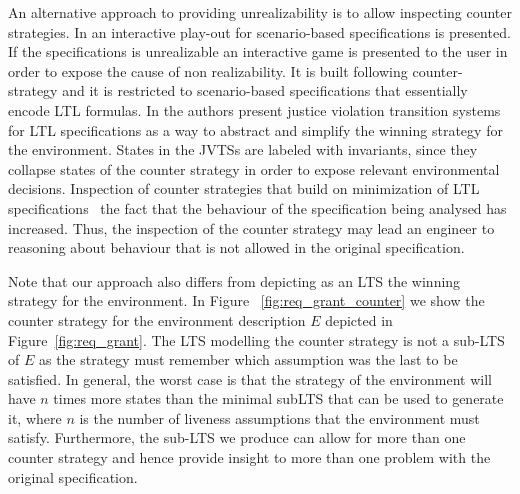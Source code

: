 An alternative approach to providing unrealizability is to allow inspecting counter strategies. 
 In \cite{DBLP:conf/emsoft/CernyGHRT12} an interactive play-out for scenario-based specifications is presented.  If the specifications is unrealizable an interactive game is presented to the user in order to expose the cause of non realizability.  It is built following \cite{DBLP:conf/hvc/KonighoferHB10} counter-strategy and it is restricted to scenario-based specifications that essentially encode LTL formulas.
 In \cite{DBLP:conf/sigsoft/KuventMR17} the authors present
 justice violation transition systems for LTL specifications as a way to abstract
 and simplify the winning strategy for the environment.
 States in the JVTSs are labeled with invariants, since
 they  collapse states of the counter strategy
 in order to expose relevant environmental decisions.
Inspection of counter strategies that build on minimization of LTL specifications~\cite{DBLP:conf/emsoft/CernyGHRT12,DBLP:conf/sigsoft/KuventMR17} the fact that the behaviour of the specification being analysed has increased. Thus, the inspection of the counter strategy may lead an engineer to reasoning about behaviour that is not allowed in the original specification. 

  

 Note that our approach also differs from depicting as an LTS the winning strategy for the environment. In Figure ~\ref{fig:req_grant_counter} we show the counter strategy for the environment description $E$ depicted in Figure~\ref{fig:req_grant}. The LTS modelling the counter strategy is not a sub-LTS of $E$ as the strategy must remember which assumption was the last to be satisfied. In general, the worst case is that the strategy of the environment will have $n$ times more states than the minimal subLTS that can be used to generate it, where $n$ is the number of liveness assumptions that the environment must satisfy. Furthermore, the sub-LTS we produce can allow for more than one counter strategy and hence provide insight to more than one problem with the original specification. 
 
 

